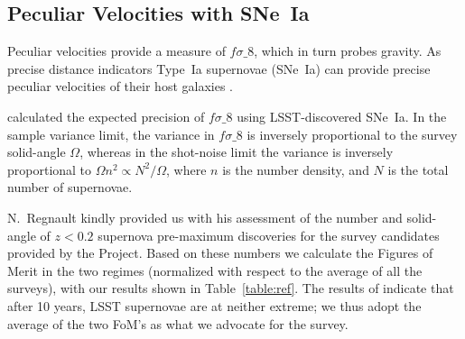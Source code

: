 \documentclass{aastex62}   	%
\begin{document}
\subsection{Peculiar Velocities with SNe~Ia}
Peculiar velocities provide a measure of $f\sigma\_8$, which in turn probes gravity.  As precise distance indicators Type~Ia supernovae (SNe~Ia)
can provide precise peculiar velocities of their host galaxies \citep{2006PhRvD..73l3526H,2011ApJ...741...67D}.

\citet{2017ApJ...847..128H} calculated the  expected precision of $f\sigma\_8$ using LSST-discovered SNe~Ia.
In the sample variance limit, the variance in $f\sigma\_8$ is inversely proportional to the survey solid-angle $\Omega$, whereas
in the shot-noise limit the variance is inversely proportional to $\Omega n^2 \propto N^2/\Omega$, where $n$ is the number density,
and $N$ is the total number of supernovae.  

N.~Regnault kindly provided us with his assessment of the number and solid-angle of $z<0.2$ supernova pre-maximum discoveries 
for the survey candidates provided by the Project.  Based on these numbers we calculate the Figures of Merit in the two regimes 
(normalized with respect to the average of all the surveys),
with our results shown in 
Table~\ref{table:ref}.  The results of \citet{2017ApJ...847..128H}  indicate that after 10 years,
LSST supernovae are at neither extreme; we thus adopt the average of the two FoM's as what we advocate for the survey.
\end{document}
